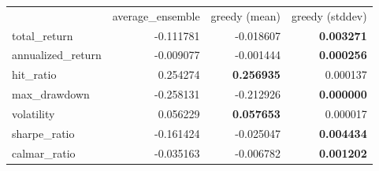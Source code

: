 \begin{tabular}{lrrr}
 & average_ensemble & greedy (mean) & greedy (stddev) \\
total_return & -0.111781 & -0.018607 & \bfseries 0.003271 \\
annualized_return & -0.009077 & -0.001444 & \bfseries 0.000256 \\
hit_ratio & 0.254274 & \bfseries 0.256935 & 0.000137 \\
max_drawdown & -0.258131 & -0.212926 & \bfseries 0.000000 \\
volatility & 0.056229 & \bfseries 0.057653 & 0.000017 \\
sharpe_ratio & -0.161424 & -0.025047 & \bfseries 0.004434 \\
calmar_ratio & -0.035163 & -0.006782 & \bfseries 0.001202 \\
\end{tabular}
